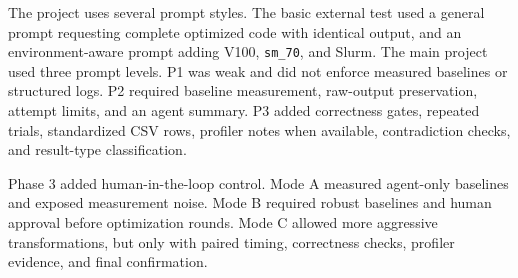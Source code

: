 \documentclass[conference]{IEEEtran}
\begin{document}
\begin{table}[t]
\centering
\caption{Audited LLM-agent optimization workflow.}
\label{tab:workflow}
\footnotesize
{}
\end{table}

The project uses several prompt styles. The basic external test used a general prompt requesting complete optimized code with identical output, and an environment-aware prompt adding V100, \texttt{sm\_70}, and Slurm. The main project used three prompt levels. P1 was weak and did not enforce measured baselines or structured logs. P2 required baseline measurement, raw-output preservation, attempt limits, and an agent summary. P3 added correctness gates, repeated trials, standardized CSV rows, profiler notes when available, contradiction checks, and result-type classification.

Phase 3 added human-in-the-loop control. Mode A measured agent-only baselines and exposed measurement noise. Mode B required robust baselines and human approval before optimization rounds. Mode C allowed more aggressive transformations, but only with paired timing, correctness checks, profiler evidence, and final confirmation.
\end{document}
